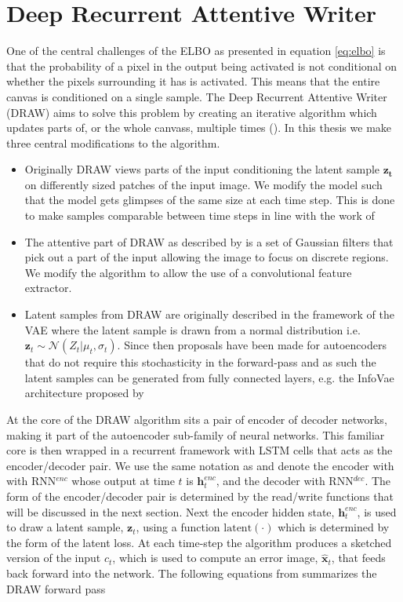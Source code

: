 \section{Deep Recurrent Attentive Writer}\label{sec:draw}

One of the central challenges of the ELBO as presented in equation \ref{eq:elbo} is that the probability of a pixel in the output being activated is not conditional on whether the pixels surrounding it has is activated. This means that the entire canvas is conditioned on a single sample. The Deep Recurrent Attentive Writer (DRAW) aims to solve this problem by creating an iterative algorithm which updates parts of, or the whole canvass, multiple times (\cite{Gregor2015}). In this thesis we make three central modifications to the algorithm. 

\begin{itemize}
\item Originally DRAW views parts of the input conditioning the latent sample $\mathbf{z_t}$ on differently sized patches of the input image. We modify the model such that the model gets glimpses of the same size at each time step. This is done to make samples comparable between time steps in line with the work of \citet{Harris2019}
\item The attentive part of DRAW as described by \citet{Gregor2015} is a set of Gaussian filters that pick out a part of the input allowing the image to focus on discrete regions. We modify the algorithm to allow the use of a convolutional feature extractor.
\item Latent samples from DRAW are originally described in the framework of the VAE where the latent sample is drawn from a normal distribution i.e. $\mathbf{z}_t \sim \mathcal{N}(Z_t|\mu_t, \sigma_t)$. Since then proposals have been made for autoencoders that do not require this stochasticity in the forward-pass and as such the latent samples can be generated from fully connected layers, e.g. the InfoVae architecture proposed by \citet{Zhao}
\end{itemize}

\noindent At the core of the DRAW algorithm sits a pair of encoder of decoder networks, making it part of the autoencoder sub-family of neural networks. This familiar core is then wrapped in a recurrent framework with LSTM cells that acts as the encoder/decoder pair. We use the same notation as \citet{Gregor2015} and denote the encoder with with RNN${}^{enc}$ whose output at time $t$ is $\mathbf{h}_t^{enc}$, and the decoder with RNN${}^{dec}$. The form of the encoder/decoder pair is determined by the read/write functions that will be discussed in the next section. Next the encoder hidden state, $\mathbf{h}_t^{enc}$, is used to draw a latent sample, $\mathbf{z}_t$, using a function $\text{latent}(\cdot)$ which is determined by the form of the latent loss. At each time-step the algorithm produces a sketched version of the input $c_t$, which is used to compute an error image, $\hat{\mathbf{x}}_t$, that feeds back forward into the network. The following equations from \citet{Gregor2015} summarizes the DRAW forward pass

